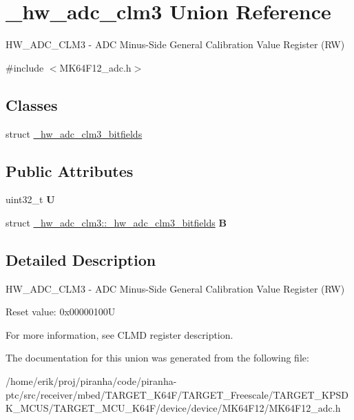 \hypertarget{union__hw__adc__clm3}{}\section{\+\_\+hw\+\_\+adc\+\_\+clm3 Union Reference}
\label{union__hw__adc__clm3}


H\+W\+\_\+\+A\+D\+C\+\_\+\+C\+L\+M3 -\/ A\+DC Minus-\/\+Side General Calibration Value Register (RW)  




{\ttfamily \#include $<$M\+K64\+F12\+\_\+adc.\+h$>$}

\subsection*{Classes}
\begin{DoxyCompactItemize}
\item 
struct \hyperlink{struct__hw__adc__clm3_1_1__hw__adc__clm3__bitfields}{\+\_\+hw\+\_\+adc\+\_\+clm3\+\_\+bitfields}
\end{DoxyCompactItemize}
\subsection*{Public Attributes}
\begin{DoxyCompactItemize}
\item 
uint32\+\_\+t {\bfseries U}\hypertarget{union__hw__adc__clm3_a85e2945b1442d9071022d3b712f66593}{}\label{union__hw__adc__clm3_a85e2945b1442d9071022d3b712f66593}

\item 
struct \hyperlink{struct__hw__adc__clm3_1_1__hw__adc__clm3__bitfields}{\+\_\+hw\+\_\+adc\+\_\+clm3\+::\+\_\+hw\+\_\+adc\+\_\+clm3\+\_\+bitfields} {\bfseries B}\hypertarget{union__hw__adc__clm3_a10728d031727dcc91a72b82c809ff4db}{}\label{union__hw__adc__clm3_a10728d031727dcc91a72b82c809ff4db}

\end{DoxyCompactItemize}


\subsection{Detailed Description}
H\+W\+\_\+\+A\+D\+C\+\_\+\+C\+L\+M3 -\/ A\+DC Minus-\/\+Side General Calibration Value Register (RW) 

Reset value\+: 0x00000100U

For more information, see C\+L\+MD register description. 

The documentation for this union was generated from the following file\+:\begin{DoxyCompactItemize}
\item 
/home/erik/proj/piranha/code/piranha-\/ptc/src/receiver/mbed/\+T\+A\+R\+G\+E\+T\+\_\+\+K64\+F/\+T\+A\+R\+G\+E\+T\+\_\+\+Freescale/\+T\+A\+R\+G\+E\+T\+\_\+\+K\+P\+S\+D\+K\+\_\+\+M\+C\+U\+S/\+T\+A\+R\+G\+E\+T\+\_\+\+M\+C\+U\+\_\+\+K64\+F/device/device/\+M\+K64\+F12/M\+K64\+F12\+\_\+adc.\+h\end{DoxyCompactItemize}
